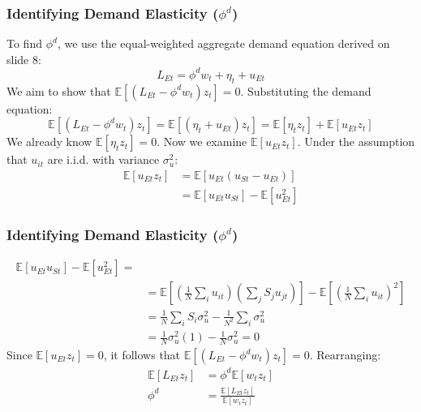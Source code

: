 \documentclass[aspectratio=169,11pt]{beamer}
\begin{document}
\begin{frame}[shrink]
    \frametitle{Identifying Demand Elasticity ($\phi^d$)}
    To find $\phi^d$, we use the equal-weighted aggregate demand equation derived on slide 8:
    \begin{equation}
        L_{Et} = \phi^d w_t + \eta_t + u_{Et} \tag{41}
    \end{equation}
    We aim to show that $\mathbb{E}[(L_{Et} - \phi^d w_t) z_t] = 0$. Substituting the demand equation:
    \begin{equation}
        \mathbb{E}[(L_{Et} - \phi^d w_t) z_t] = \mathbb{E}[(\eta_t + u_{Et}) z_t] = \mathbb{E}[\eta_t z_t] + \mathbb{E}[u_{Et} z_t]
    \end{equation}
    We already know $\mathbb{E}[\eta_t z_t] = 0$. Now we examine $\mathbb{E}[u_{Et} z_t]$. Under the assumption that $u_{it}$ are i.i.d. with variance $\sigma_u^2$:
    \begin{align*}
        \mathbb{E}[u_{Et} z_t] & = \mathbb{E}[u_{Et} (u_{St} - u_{Et})]             \\
                               & = \mathbb{E}[u_{Et} u_{St}] - \mathbb{E}[u_{Et}^2]
    \end{align*}
    \vspace{0.1cm}
    \hfill \hyperlink{src_psi_identification}{}
\end{frame}
\begin{frame}[shrink]
    \frametitle{Identifying Demand Elasticity ($\phi^d$)}
    \begin{align*}
        \mathbb{E}[u_{Et} u_{St}] - \mathbb{E}[u_{Et}^2]    =
        \\
         & = \mathbb{E} \left[ \left( \frac{1}{N} \sum_{i} u_{it} \right) \left( \sum_{j} S_j u_{jt} \right) \right] - \mathbb{E} \left[ \left( \frac{1}{N} \sum_{i} u_{it} \right)^2 \right] \\
         & = \frac{1}{N} \sum_{i} S_i \sigma_u^2 - \frac{1}{N^2} \sum_{i} \sigma_u^2                                                                                                          \\
         & = \frac{1}{N} \sigma_u^2 (1) - \frac{1}{N} \sigma_u^2 = 0
    \end{align*}
    Since $\mathbb{E}[u_{Et} z_t] = 0$, it follows that $\mathbb{E}[(L_{Et} - \phi^d w_t) z_t] = 0$. Rearranging:
    \begin{align*}
        \mathbb{E}[L_{Et} z_t] & = \phi^d \mathbb{E}[w_t z_t]                         \\
        \phi^d                 & = \frac{\mathbb{E}[L_{Et} z_t]}{\mathbb{E}[w_t z_t]}
    \end{align*}
    \vspace{0.1cm}
    \hfill \hyperlink{src_psi_identification}{}
\end{frame}
\end{document}
